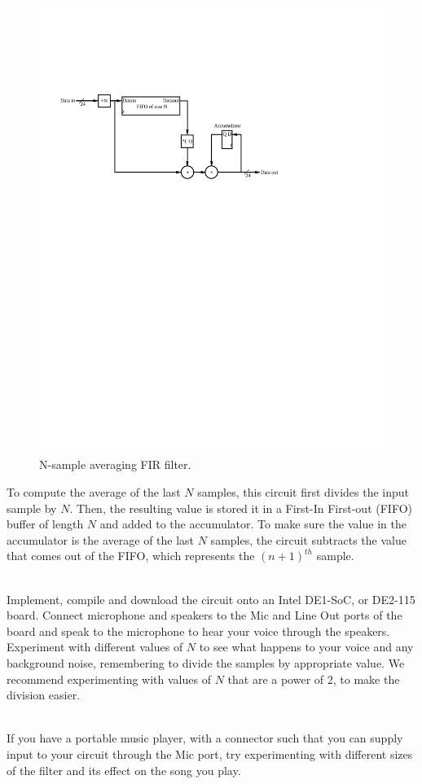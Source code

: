 \documentclass[epsfig,10pt,fullpage]{article}
\newcommand{\CommonDocsPath}{../../../common/docs}
\begin{document}
\begin{figure}[H]
\centering
\includegraphics{figures/n_tap_averaging_fir_filter.pdf}
\caption{N-sample averaging FIR filter.}
\label{fig:scalable_averaging_fir}
\end{figure}

To compute the average of the last $N$ samples, this circuit first divides the input sample by $N$. Then, the resulting value
is stored it in a First-In First-out (FIFO) buffer of length $N$ and added to the accumulator. To make sure the value
in the accumulator is the average of the last $N$ samples, the circuit subtracts the value that comes out of the FIFO,
which represents the $(n+1)^{th}$ sample.

~\\
Implement, compile and download the circuit onto an Intel DE1-SoC, or DE2-115 board. Connect microphone and speakers to the {\sf Mic} and {\sf Line Out}
ports of the board and speak to the microphone to hear your voice through the speakers. Experiment with different values of $N$ to see what happens
to your voice and any background noise, remembering to divide the samples by appropriate value. We recommend experimenting with values of $N$ that are a power of 2, to make the division easier.

~\\
If you have a portable music player, with a connector such that you can supply input to your circuit through the {\sf Mic} port, try experimenting with
different sizes of the filter and its effect on the song you play. 



\end{document}
